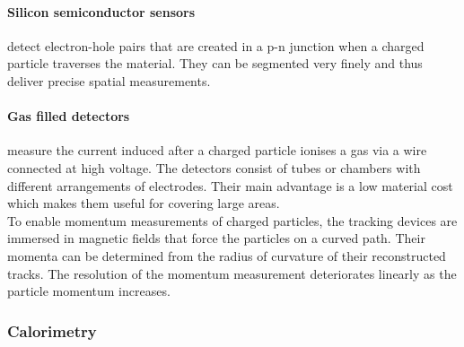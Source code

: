 \paragraph{Silicon semiconductor sensors} detect electron-hole pairs that are created in a p-n junction when a charged particle traverses the material. They can be segmented very finely and thus deliver precise spatial measurements.
\paragraph{Gas filled detectors} measure the current induced after a charged particle ionises a gas via a wire connected at high voltage. The detectors consist of tubes or chambers with different arrangements of electrodes. Their main advantage is a low material cost which makes them useful for covering large areas. \\
\newline
To enable momentum measurements of charged particles, the tracking devices are immersed in magnetic fields that force the particles on a curved path. Their momenta can be determined from the radius of curvature of their reconstructed tracks. The resolution of the momentum measurement deteriorates linearly as the particle momentum increases.

\subsubsection{Calorimetry}

